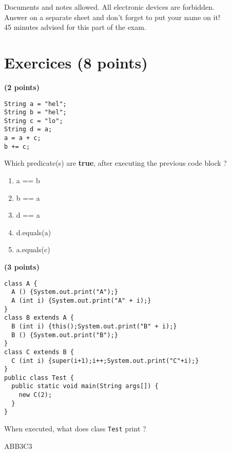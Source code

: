 \documentclass[correction]{exercices}
\begin{document}

\begin{center}
Documents and notes allowed. All electronic devices are forbidden.
\\Answer on a separate sheet and don't forget to put your name on it!
\\45 minutes advised for this part of the exam.
\end{center}

\section{Exercices (8 points)}

\begin{question} \textbf{(2 points)}
\begin{verbatim}
String a = "hel";
String b = "hel";
String c = "lo";
String d = a;
a = a + c;
b += c;
\end{verbatim}

Which predicate(s) are \textbf{true}, after
executing the previous code block ?

\begin{multicols}{2}
\begin{enumerate}
\item a == b
\item b == a
\item d == a
\item d.equals(a)
\item a.equals(c)
\end{enumerate}
\end{multicols}
\end{question}


\begin{question} \textbf{(3 points)}
\begin{verbatim}
class A {
  A () {System.out.print("A");}
  A (int i) {System.out.print("A" + i);}
}
class B extends A {
  B (int i) {this();System.out.print("B" + i);}
  B () {System.out.print("B");}
}
class C extends B {
  C (int i) {super(i+1);i++;System.out.print("C"+i);}
}
public class Test {
  public static void main(String args[]) {
    new C(2);
  }
}
\end{verbatim}

When executed, what does class \verb!Test! print ?
\begin{correction}
ABB3C3
\end{correction}
\end{question}
\end{document}
